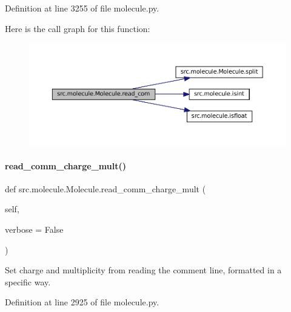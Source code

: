 Definition at line 3255 of file molecule.\+py.

Here is the call graph for this function\+:
\nopagebreak
\begin{figure}[H]
\begin{center}
\leavevmode
\includegraphics[width=350pt]{classsrc_1_1molecule_1_1Molecule_a742c96f62c86d00ac97bb5004f8ebd92_cgraph}
\end{center}
\end{figure}
\mbox{\label{classsrc_1_1molecule_1_1Molecule_a7aeff86c1d2b8f73bea9191b33f665c3}} 
\paragraph{\texorpdfstring{read\+\_\+comm\+\_\+charge\+\_\+mult()}{read\_comm\_charge\_mult()}}
{\footnotesize\ttfamily def src.\+molecule.\+Molecule.\+read\+\_\+comm\+\_\+charge\+\_\+mult (\begin{DoxyParamCaption}\item[{}]{self,  }\item[{}]{verbose = {\ttfamily False} }\end{DoxyParamCaption})}



Set charge and multiplicity from reading the comment line, formatted in a specific way. 



Definition at line 2925 of file molecule.\+py.

